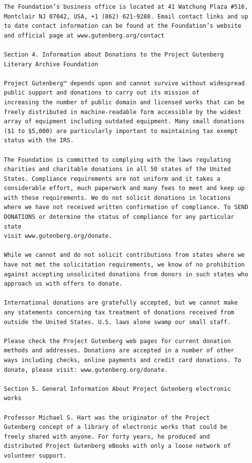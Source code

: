 \documentclass{article}
\begin{document}
\begin{verbatim}
The Foundation’s business office is located at 41 Watchung Plaza #516,
Montclair NJ 07042, USA, +1 (862) 621-9288. Email contact links and up
to date contact information can be found at the Foundation’s website
and official page at www.gutenberg.org/contact

Section 4. Information about Donations to the Project Gutenberg
Literary Archive Foundation

Project Gutenberg™ depends upon and cannot survive without widespread
public support and donations to carry out its mission of
increasing the number of public domain and licensed works that can be
freely distributed in machine-readable form accessible by the widest
array of equipment including outdated equipment. Many small donations
($1 to $5,000) are particularly important to maintaining tax exempt
status with the IRS.

The Foundation is committed to complying with the laws regulating
charities and charitable donations in all 50 states of the United
States. Compliance requirements are not uniform and it takes a
considerable effort, much paperwork and many fees to meet and keep up
with these requirements. We do not solicit donations in locations
where we have not received written confirmation of compliance. To SEND
DONATIONS or determine the status of compliance for any particular state
visit www.gutenberg.org/donate.

While we cannot and do not solicit contributions from states where we
have not met the solicitation requirements, we know of no prohibition
against accepting unsolicited donations from donors in such states who
approach us with offers to donate.

International donations are gratefully accepted, but we cannot make
any statements concerning tax treatment of donations received from
outside the United States. U.S. laws alone swamp our small staff.

Please check the Project Gutenberg web pages for current donation
methods and addresses. Donations are accepted in a number of other
ways including checks, online payments and credit card donations. To
donate, please visit: www.gutenberg.org/donate.

Section 5. General Information About Project Gutenberg electronic works

Professor Michael S. Hart was the originator of the Project
Gutenberg concept of a library of electronic works that could be
freely shared with anyone. For forty years, he produced and
distributed Project Gutenberg eBooks with only a loose network of
volunteer support.


\end{verbatim}
\end{document}
